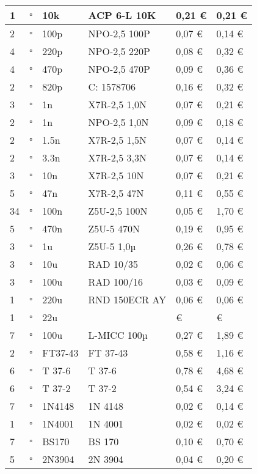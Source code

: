 \documentclass[10pt, a4paper]{scrartcl}
\begin{document}
\begin{longtable}{|p{}|p{}|p{}|p{}|p{}|p{}|}
1 & $\square$ & 10k & ACP 6-L 10K & 0,21 \euro & 0,21 \euro \\ \hline
2 & $\square$ & 100p & NPO-2,5 100P & 0,07 \euro & 0,14 \euro \\
4 & $\square$ & 220p & NPO-2,5 220P & 0,08 \euro & 0,32 \euro \\
4 & $\square$ & 470p & NPO-2,5 470P & 0,09 \euro & 0,36 \euro \\
2 & $\square$ & 820p & C: 1578706 & 0,16 \euro & 0,32 \euro \\
3 & $\square$ & 1n & X7R-2,5 1,0N & 0,07 \euro & 0,21 \euro \\
2 & $\square$ & 1n & NPO-2,5 1,0N & 0,09 \euro & 0,18 \euro \\
2 & $\square$ & 1.5n & X7R-2,5 1,5N & 0,07 \euro & 0,14 \euro \\
2 & $\square$ & 3.3n & X7R-2,5 3,3N & 0,07 \euro & 0,14 \euro \\
3 & $\square$ & 10n & X7R-2,5 10N & 0,07 \euro & 0,21 \euro \\
5 & $\square$ & 47n & X7R-2,5 47N & 0,11 \euro & 0,55 \euro \\
34 & $\square$ & 100n & Z5U-2,5 100N & 0,05 \euro & 1,70 \euro \\
5 & $\square$ & 470n & Z5U-5 470N & 0,19 \euro & 0,95 \euro \\
3 & $\square$ & 1u & Z5U-5 1,0µ & 0,26 \euro & 0,78 \euro \\ \hline		
3 & $\square$ & 10u & RAD 10/35 & 0,02 \euro & 0,06 \euro \\
3 & $\square$ & 100u & RAD 100/16 & 0,03 \euro & 0,09 \euro \\
1 & $\square$ & 220u & RND 150ECR AY & 0,06 \euro & 0,06 \euro \\ \hline
1 & $\square$ & 22u & & \euro & \euro \\
7 & $\square$ & 100u & L-MICC 100µ & 0,27 \euro & 1,89 \euro \\ \hline
2 & $\square$ & FT37-43 & FT 37-43 & 0,58 \euro & 1,16 \euro \\
6 & $\square$ & T 37-6 & T 37-6 & 0,78 \euro & 4,68 \euro \\
6 & $\square$ & T 37-2 & T 37-2 & 0,54 \euro & 3,24 \euro \\ \hline
7 & $\square$ & 1N4148 & 1N 4148 & 0,02 \euro & 0,14 \euro \\
1 & $\square$ & 1N4001 & 1N 4001 & 0,02 \euro & 0,02 \euro \\
7 & $\square$ & BS170 & BS 170 & 0,10 \euro & 0,70 \euro \\
5 & $\square$ & 2N3904 & 2N 3904 & 0,04 \euro & 0,20 \euro \\

\end{longtable}
\end{document}
